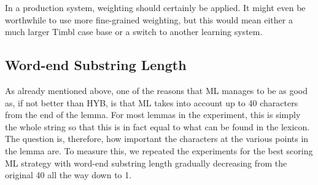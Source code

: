\documentclass[a4paper,10pt,twoside]{article}
\begin{document}
In a production system, weighting should certainly be applied. It might even be worthwhile to use more fine-grained weighting, but this would mean either a much larger Timbl case base or a switch to another learning system.


\subsection{Word-end Substring Length}
\label{sec_settings_suflen}
As already mentioned above, one of the reasons that ML manages to be as good as, if not better than HYB, is that ML takes into account up to 40 characters from the end of the lemma. For most lemmas in the experiment, this is simply the whole string so that this is in fact equal to what can be found in the lexicon. The question is, therefore, how important the characters at the various points in the lemma are. To measure this, we repeated the experiments for the best scoring ML strategy with word-end substring length gradually decreasing from the original 40 all the way down to 1.
\end{document}
